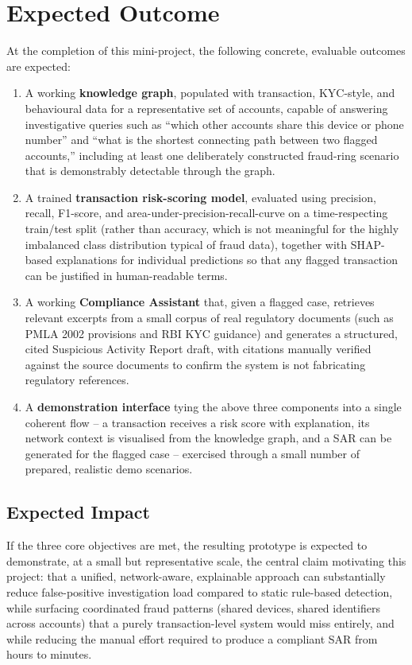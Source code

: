\chapter{Expected Outcome}

At the completion of this mini-project, the following concrete, evaluable outcomes are expected:

\begin{enumerate}
    \item A working \textbf{knowledge graph}, populated with transaction, KYC-style, and behavioural data for a representative set of accounts, capable of answering investigative queries such as ``which other accounts share this device or phone number'' and ``what is the shortest connecting path between two flagged accounts,'' including at least one deliberately constructed fraud-ring scenario that is demonstrably detectable through the graph.
    \item A trained \textbf{transaction risk-scoring model}, evaluated using precision, recall, F1-score, and area-under-precision-recall-curve on a time-respecting train/test split (rather than accuracy, which is not meaningful for the highly imbalanced class distribution typical of fraud data), together with SHAP-based explanations for individual predictions so that any flagged transaction can be justified in human-readable terms.
    \item A working \textbf{Compliance Assistant} that, given a flagged case, retrieves relevant excerpts from a small corpus of real regulatory documents (such as PMLA 2002 provisions and RBI KYC guidance) and generates a structured, cited Suspicious Activity Report draft, with citations manually verified against the source documents to confirm the system is not fabricating regulatory references.
    \item A \textbf{demonstration interface} tying the above three components into a single coherent flow -- a transaction receives a risk score with explanation, its network context is visualised from the knowledge graph, and a SAR can be generated for the flagged case -- exercised through a small number of prepared, realistic demo scenarios.
\end{enumerate}

\section{Expected Impact}

If the three core objectives are met, the resulting prototype is expected to demonstrate, at a small but representative scale, the central claim motivating this project: that a unified, network-aware, explainable approach can substantially reduce false-positive investigation load compared to static rule-based detection, while surfacing coordinated fraud patterns (shared devices, shared identifiers across accounts) that a purely transaction-level system would miss entirely, and while reducing the manual effort required to produce a compliant SAR from hours to minutes.

